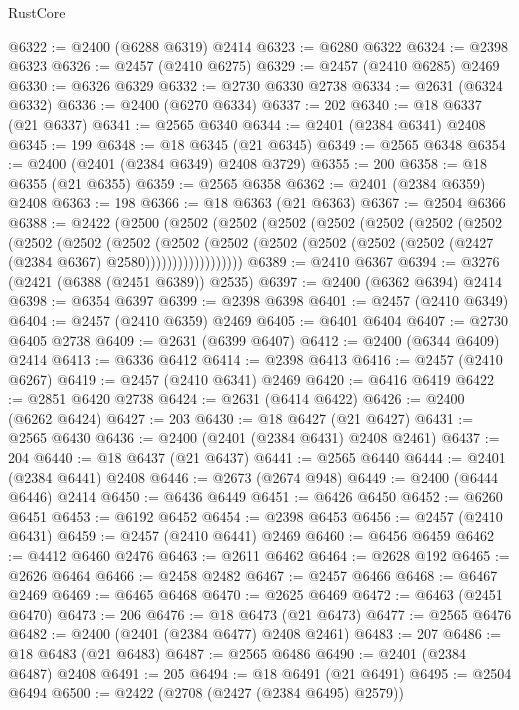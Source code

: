\begin{lexlean}{RustCore}
\begin{coremodule}
@6322 := @2400 (@6288 @6319) @2414
@6323 := @6280 @6322
@6324 := @2398 @6323
@6326 := @2457 (@2410 @6275)
@6329 := @2457 (@2410 @6285) @2469
@6330 := @6326 @6329
@6332 := @2730 @6330 @2738
@6334 := @2631 (@6324 @6332)
@6336 := @2400 (@6270 @6334)
@6337 := 202
@6340 := @18 @6337 (@21 @6337)
@6341 := @2565 @6340
@6344 := @2401 (@2384 @6341) @2408
@6345 := 199
@6348 := @18 @6345 (@21 @6345)
@6349 := @2565 @6348
@6354 := @2400 (@2401 (@2384 @6349) @2408 @3729)
@6355 := 200
@6358 := @18 @6355 (@21 @6355)
@6359 := @2565 @6358
@6362 := @2401 (@2384 @6359) @2408
@6363 := 198
@6366 := @18 @6363 (@21 @6363)
@6367 := @2504 @6366
@6388 := @2422
    (@2500
      (@2502
        (@2502
          (@2502
            (@2502
              (@2502
                (@2502
                  (@2502
                    (@2502
                      (@2502
                        (@2502
                          (@2502
                            (@2502
                              (@2502
                                (@2502 (@2502 (@2502 (@2427 (@2384 @6367) @2580))))))))))))))))))
@6389 := @2410 @6367
@6394 := @3276 (@2421 (@6388 (@2451 @6389)) @2535)
@6397 := @2400 (@6362 @6394) @2414
@6398 := @6354 @6397
@6399 := @2398 @6398
@6401 := @2457 (@2410 @6349)
@6404 := @2457 (@2410 @6359) @2469
@6405 := @6401 @6404
@6407 := @2730 @6405 @2738
@6409 := @2631 (@6399 @6407)
@6412 := @2400 (@6344 @6409) @2414
@6413 := @6336 @6412
@6414 := @2398 @6413
@6416 := @2457 (@2410 @6267)
@6419 := @2457 (@2410 @6341) @2469
@6420 := @6416 @6419
@6422 := @2851 @6420 @2738
@6424 := @2631 (@6414 @6422)
@6426 := @2400 (@6262 @6424)
@6427 := 203
@6430 := @18 @6427 (@21 @6427)
@6431 := @2565 @6430
@6436 := @2400 (@2401 (@2384 @6431) @2408 @2461)
@6437 := 204
@6440 := @18 @6437 (@21 @6437)
@6441 := @2565 @6440
@6444 := @2401 (@2384 @6441) @2408
@6446 := @2673 (@2674 @948)
@6449 := @2400 (@6444 @6446) @2414
@6450 := @6436 @6449
@6451 := @6426 @6450
@6452 := @6260 @6451
@6453 := @6192 @6452
@6454 := @2398 @6453
@6456 := @2457 (@2410 @6431)
@6459 := @2457 (@2410 @6441) @2469
@6460 := @6456 @6459
@6462 := @4412 @6460 @2476
@6463 := @2611 @6462
@6464 := @2628 @192
@6465 := @2626 @6464
@6466 := @2458 @2482
@6467 := @2457 @6466
@6468 := @6467 @2469
@6469 := @6465 @6468
@6470 := @2625 @6469
@6472 := @6463 (@2451 @6470)
@6473 := 206
@6476 := @18 @6473 (@21 @6473)
@6477 := @2565 @6476
@6482 := @2400 (@2401 (@2384 @6477) @2408 @2461)
@6483 := 207
@6486 := @18 @6483 (@21 @6483)
@6487 := @2565 @6486
@6490 := @2401 (@2384 @6487) @2408
@6491 := 205
@6494 := @18 @6491 (@21 @6491)
@6495 := @2504 @6494
@6500 := @2422 (@2708 (@2427 (@2384 @6495) @2579))

\end{coremodule}
\end{lexlean}
